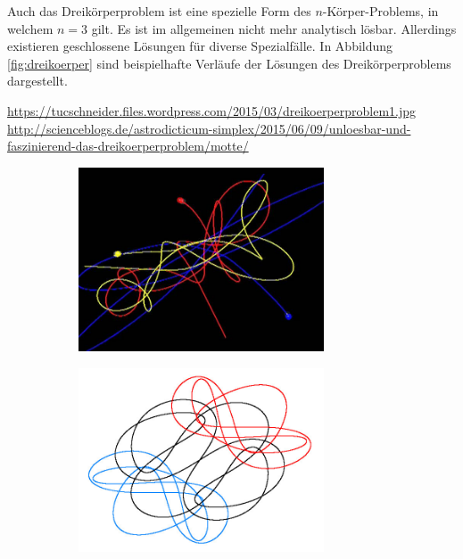     Auch das Dreikörperproblem ist eine spezielle Form des $n$-Körper-Problems, in welchem $n=3$ gilt.
    Es ist im allgemeinen nicht mehr analytisch lösbar.
    Allerdings existieren geschlossene Lösungen für diverse Spezialfälle.
    In Abbildung \ref{fig:dreikoerper} sind beispielhafte Verläufe der Lösungen des Dreikörperproblems dargestellt.

    \urldef{\urldreikoerper}\url{https://tucschneider.files.wordpress.com/2015/03/dreikoerperproblem1.jpg}
    \urldef{\urlmotte}\url{http://scienceblogs.de/astrodicticum-simplex/2015/06/09/unloesbar-und-faszinierend-das-dreikoerperproblem/motte/}
    \begin{figure}[h]
      \center
      \begin{subfigure}{0.49\textwidth}
        \center
        \includegraphics[width=0.8\textwidth]{pictures/dreikoerperproblem1.jpg}
      \end{subfigure}
      \begin{subfigure}{0.49\textwidth}
        \center
        \includegraphics[width=0.8\textwidth]{pictures/motte.jpg}

\end{subfigure}
\end{figure}
